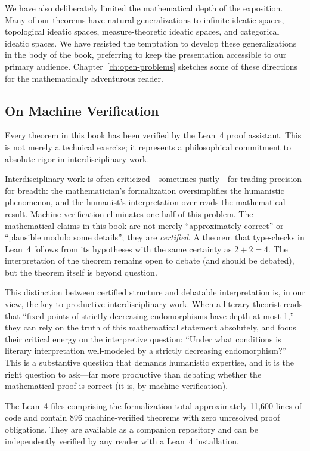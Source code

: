 \documentclass[11pt,openany]{book}
\theoremstyle{definition}
\theoremstyle{plain}
\theoremstyle{remark}
\begin{document}
We have also deliberately limited the mathematical depth of the exposition. Many of our theorems have natural generalizations to infinite ideatic spaces, topological ideatic spaces, measure-theoretic ideatic spaces, and categorical ideatic spaces. We have resisted the temptation to develop these generalizations in the body of the book, preferring to keep the presentation accessible to our primary audience. Chapter~\ref{ch:open-problems} sketches some of these directions for the mathematically adventurous reader.

\subsection*{On Machine Verification}

Every theorem in this book has been verified by the Lean~4 proof assistant. This is not merely a technical exercise; it represents a philosophical commitment to absolute rigor in interdisciplinary work.

Interdisciplinary work is often criticized---sometimes justly---for trading precision for breadth: the mathematician's formalization oversimplifies the humanistic phenomenon, and the humanist's interpretation over-reads the mathematical result. Machine verification eliminates one half of this problem. The mathematical claims in this book are not merely ``approximately correct'' or ``plausible modulo some details''; they are \emph{certified}. A theorem that type-checks in Lean~4 follows from its hypotheses with the same certainty as $2 + 2 = 4$. The interpretation of the theorem remains open to debate (and should be debated), but the theorem itself is beyond question.

This distinction between certified structure and debatable interpretation is, in our view, the key to productive interdisciplinary work. When a literary theorist reads that ``fixed points of strictly decreasing endomorphisms have depth at most 1,'' they can rely on the truth of this mathematical statement absolutely, and focus their critical energy on the interpretive question: ``Under what conditions is literary interpretation well-modeled by a strictly decreasing endomorphism?'' This is a substantive question that demands humanistic expertise, and it is the right question to ask---far more productive than debating whether the mathematical proof is correct (it is, by machine verification).

The Lean~4 files comprising the formalization total approximately 11,600 lines of code and contain 896 machine-verified theorems with zero unresolved proof obligations. They are available as a companion repository and can be independently verified by any reader with a Lean~4 installation.
\end{document}
